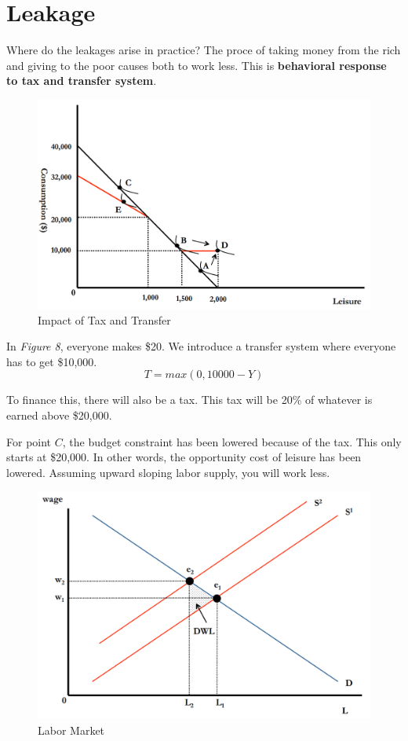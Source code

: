 \documentclass{article}
\begin{document}
\section{ Leakage }

Where do the leakages arise in practice? The proce of taking money from the
rich and giving to the poor causes both to work less. This is \textbf{behavioral
response to tax and transfer system}.

\begin{figure}[H]
    \centering
    \includegraphics[scale=0.55]{"Impact of Tax and Transfer"}
    \caption{Impact of Tax and Transfer}
\end{figure}

In \textit{Figure 8}, everyone makes \$20. We introduce a transfer system where
everyone has to get \$10,000. 
$$ T = max( 0, 10000 - Y ) $$

To finance this, there will also be a tax. This tax will be 20\% of whatever is
earned above \$20,000. 

For point $C$, the budget constraint has been lowered because of the tax. This
only starts at \$20,000. In other words, the opportunity cost of leisure has
been lowered. Assuming upward sloping labor supply, you will work less.

\begin{figure}[H]
    \centering
    \includegraphics[scale=0.55]{"Labor Market"}
    \caption{Labor Market}
\end{figure}
\end{document}
